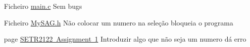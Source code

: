 
\begin{DoxyRefList}
\item[Ficheiro \mbox{\hyperlink{main_8c}{main.c}} ]\label{bug__bug000001}%
%
Sem bugs  
\item[Ficheiro \mbox{\hyperlink{MySAG_8h}{My\+SAG.h}} ]\label{bug__bug000002}%
%
Não colocar um numero na seleção bloqueia o programa  
\item[page \mbox{\hyperlink{index}{SETR2122 Assignment 1}} ]\label{bug__bug000003}%
%
Introduzir algo que não seja um numero dá erro
\end{DoxyRefList}